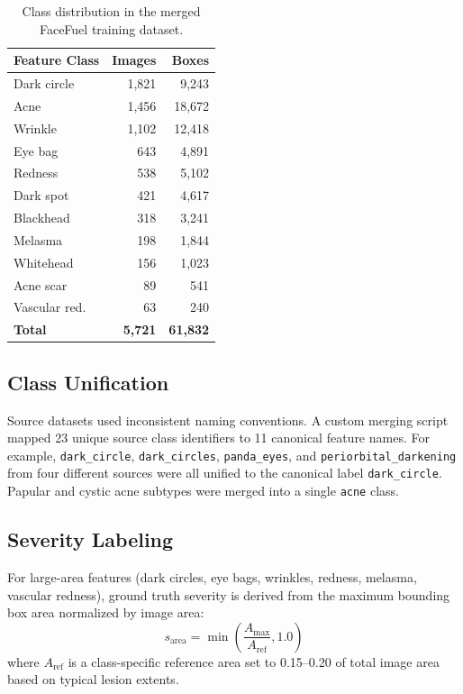 \documentclass[journal]{IEEEtran}
\begin{document}
\begin{table}[h]
\centering
\caption{Class distribution in the merged FaceFuel training dataset.}
\label{tab:dataset}
\begin{tabular}{lrr}
\toprule
\textbf{Feature Class} & \textbf{Images} & \textbf{Boxes} \\
\midrule
Dark circle      & 1,821 &  9,243 \\
Acne             & 1,456 & 18,672 \\
Wrinkle          & 1,102 & 12,418 \\
Eye bag          &   643 &  4,891 \\
Redness          &   538 &  5,102 \\
Dark spot        &   421 &  4,617 \\
Blackhead        &   318 &  3,241 \\
Melasma          &   198 &  1,844 \\
Whitehead        &   156 &  1,023 \\
Acne scar        &    89 &    541 \\
Vascular red.    &    63 &    240 \\
\midrule
\textbf{Total}   & \textbf{5,721} & \textbf{61,832} \\
\bottomrule
\end{tabular}
\end{table}

\subsection{Class Unification}

Source datasets used inconsistent naming conventions. A custom merging script
mapped 23 unique source class identifiers to 11 canonical feature names.
For example, \texttt{dark\_circle}, \texttt{dark\_circles}, \texttt{panda\_eyes},
and \texttt{periorbital\_darkening} from four different sources were all unified
to the canonical label \texttt{dark\_circle}. Papular and cystic acne subtypes
were merged into a single \texttt{acne} class.

\subsection{Severity Labeling}

For large-area features (dark circles, eye bags, wrinkles, redness, melasma,
vascular redness), ground truth severity is derived from the maximum bounding
box area normalized by image area:
\begin{equation}
s_{\text{area}} = \min\!\left(\frac{A_{\max}}{A_{\text{ref}}}, 1.0\right)
\label{eq:area_sev}
\end{equation}
where $A_{\text{ref}}$ is a class-specific reference area set to 0.15--0.20
of total image area based on typical lesion extents.
\end{document}
